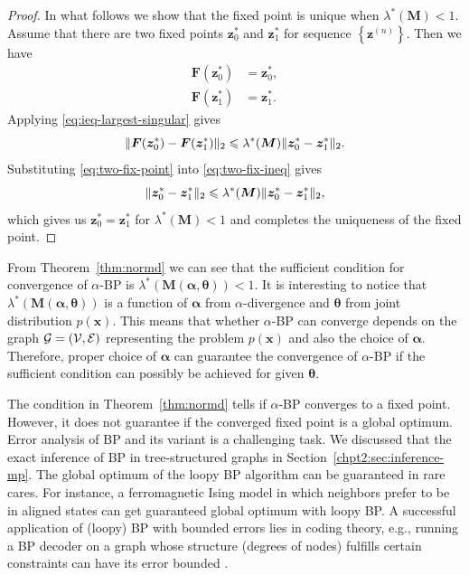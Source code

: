 \begin{proof}
  In what follows we show that the fixed point is unique when $\lambda^{\ast}(\bm{M})<1$. Assume that there are two fixed points $\bm{z}_0^{\ast}$ and $\bm{z}_1^{\ast}$ for sequence $\left\{ \bm{z}^{(n)} \right\}$. Then we have
  \begin{align}\label{eq:two-fix-point}
    \bm{F}(\bm{z}_0^{\ast}) &= \bm{z}_0^{\ast}, \nonumber\\
    \bm{F}(\bm{z}_1^{\ast}) &= \bm{z}_1^{\ast}. 
  \end{align}
  Applying \eqref{eq:ieq-largest-singular} gives
  \begin{equation}\label{eq:two-fix-ineq}
    \| \bm{F}(\bm{z}_0^{\ast}) - \bm{F}(\bm{z}_1^{\ast}) \|_{2} \leqslant
    \lambda^{\ast}(\bm{M})\| \bm{z}_0^{\ast} - \bm{z}_1^{\ast} \|_{2}.
  \end{equation}
  Substituting \eqref{eq:two-fix-point} into \eqref{eq:two-fix-ineq}
  gives
  \begin{equation}
    \| \bm{z}_0^{\ast} - \bm{z}_1^{\ast} \|_{2} \leqslant
    \lambda^{\ast}(\bm{M})\| \bm{z}_0^{\ast} - \bm{z}_1^{\ast} \|_{2},
  \end{equation}
  which gives us $\bm{z}_0^{\ast} = \bm{z}_1^{\ast}$ for $\lambda^{\ast}(\bm{M})<1$ and completes the uniqueness of the fixed point.
\end{proof}

\begin{remark}
  From Theorem~\ref{thm:normd} we can see that the sufficient condition for convergence of $\alpha$-BP is $\lambda^{\ast}(\bm{M}(\bm{\alpha}, \bm{\theta})) < 1$. It is interesting to notice that $\lambda^{\ast}(\bm{M}(\bm{\alpha}, \bm{\theta}))$ is a function of $\bm{\alpha}$ from $\alpha$-divergence and $\bm{\theta}$ from joint distribution $p(\bm{x})$. This means that whether $\alpha$-BP can converge depends on the graph $\mathcal{G}= (\mathcal{V}, \mathcal{E})$ representing the problem $p(\bm{x})$ and also the choice of $\bm{\alpha}$. Therefore, proper choice of $\bm{\alpha}$ can guarantee the convergence of $\alpha$-BP if the sufficient condition can possibly be achieved for given $\bm{\theta}$.
\end{remark}

\begin{remark}
  The condition in Theorem~\ref{thm:normd} tells if $\alpha$-BP converges to a fixed point. However, it does not guarantee if the converged fixed point is a global optimum. Error analysis of BP and its variant is a challenging task. We discussed that the exact inference of BP in tree-structured graphs in Section~\ref{chpt2:sec:inference-mp}. The global optimum of the loopy BP algorithm can be guaranteed in rare cares. For instance, a ferromagnetic Ising model in which neighbors prefer to be in aligned states can get guaranteed global optimum with loopy BP\cite{frederic2019fast}. A successful application of (loopy) BP with bounded errors lies in coding theory, e.g., running a BP decoder on a graph whose structure (degrees of nodes) fulfills certain constraints can have its error bounded \cite{richardson2001}\cite[Section~7.2]{richardson2008}. 
\end{remark}

